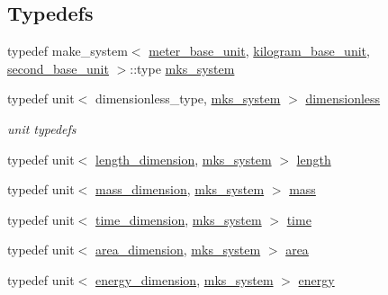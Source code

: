 \subsection*{Typedefs}
\begin{DoxyCompactItemize}
\item 
typedef make\+\_\+system$<$ \hyperlink{structboost_1_1units_1_1test_1_1meter__base__unit}{meter\+\_\+base\+\_\+unit}, \hyperlink{structboost_1_1units_1_1test_1_1kilogram__base__unit}{kilogram\+\_\+base\+\_\+unit}, \hyperlink{structboost_1_1units_1_1test_1_1second__base__unit}{second\+\_\+base\+\_\+unit} $>$\+::type \hyperlink{namespaceboost_1_1units_1_1test_a8e4ee21bbeef605222c8533bb4def1bb}{mks\+\_\+system}
\item 
typedef unit$<$ dimensionless\+\_\+type, \hyperlink{namespaceboost_1_1units_1_1test_a8e4ee21bbeef605222c8533bb4def1bb}{mks\+\_\+system} $>$ \hyperlink{namespaceboost_1_1units_1_1test_a926174a372ce3b4577e6c06ccd8b291e}{dimensionless}
\begin{DoxyCompactList}\small\item\em unit typedefs \end{DoxyCompactList}\item 
typedef unit$<$ \hyperlink{namespaceboost_1_1units_ae50eae7dfa312b039ce7aac232ac27c4}{length\+\_\+dimension}, \hyperlink{namespaceboost_1_1units_1_1test_a8e4ee21bbeef605222c8533bb4def1bb}{mks\+\_\+system} $>$ \hyperlink{namespaceboost_1_1units_1_1test_abb80de321402f6f139e1a1b182ea4655}{length}
\item 
typedef unit$<$ \hyperlink{namespaceboost_1_1units_a5baec398fcf78171420ff24e743f1faa}{mass\+\_\+dimension}, \hyperlink{namespaceboost_1_1units_1_1test_a8e4ee21bbeef605222c8533bb4def1bb}{mks\+\_\+system} $>$ \hyperlink{namespaceboost_1_1units_1_1test_ac20a8750e8cda0bf9f5ab0571dec9210}{mass}
\item 
typedef unit$<$ \hyperlink{namespaceboost_1_1units_a8fc0b5bca117a7c220c018021ebe821f}{time\+\_\+dimension}, \hyperlink{namespaceboost_1_1units_1_1test_a8e4ee21bbeef605222c8533bb4def1bb}{mks\+\_\+system} $>$ \hyperlink{namespaceboost_1_1units_1_1test_aa6015c1af04d051a648ce2d7bb3a6876}{time}
\item 
typedef unit$<$ \hyperlink{namespaceboost_1_1units_aaa72083d461d56b8a6163423691c2c6a}{area\+\_\+dimension}, \hyperlink{namespaceboost_1_1units_1_1test_a8e4ee21bbeef605222c8533bb4def1bb}{mks\+\_\+system} $>$ \hyperlink{namespaceboost_1_1units_1_1test_aefe7b1b4d24a0c81afb2d61774143151}{area}
\item 
typedef unit$<$ \hyperlink{namespaceboost_1_1units_a6925a7132e69383f3bcf68b27cdb9475}{energy\+\_\+dimension}, \hyperlink{namespaceboost_1_1units_1_1test_a8e4ee21bbeef605222c8533bb4def1bb}{mks\+\_\+system} $>$ \hyperlink{namespaceboost_1_1units_1_1test_a5a1d8a7c46b82b43a4f4cd4a0ddcec59}{energy}
\end{DoxyCompactItemize}
